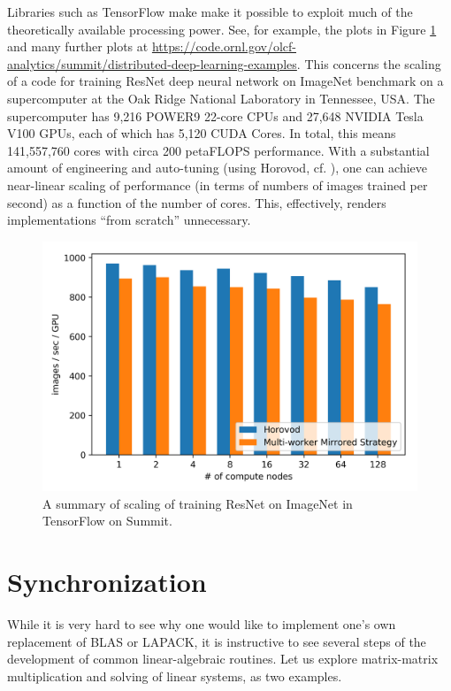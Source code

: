 Libraries such as TensorFlow make make it possible to
exploit much of the theoretically available processing 
power. See, for example, the plots 
in Figure \ref{fig:summit-tensorflow-performance2} and 
many further plots at 
\url{https://code.ornl.gov/olcf-analytics/summit/distributed-deep-learning-examples}.
This concerns the scaling of a code for training ResNet deep neural network on ImageNet 
benchmark on a supercomputer at the Oak Ridge National Laboratory 
in Tennessee, USA. 
The supercomputer has 
9,216 POWER9 22-core CPUs and 
27,648 NVIDIA Tesla V100 GPUs, each of which has 
5,120 CUDA Cores. 
In total, this means 141,557,760 cores with circa
200 petaFLOPS performance.
With a substantial amount of engineering and 
auto-tuning (using Horovod, cf. \cite{8945109}), one can achieve
near-linear scaling of performance (in terms of numbers of images trained per second) 
as a function of the number of cores. 
This, effectively, renders implementations 
``from scratch'' unnecessary. 

\begin{figure}[t!]
    \includegraphics[width=\textwidth]{./static/summit-tensorflow-performance2.png}
    \caption{A summary of scaling of training ResNet on ImageNet in TensorFlow on Summit.}
    \label{fig:summit-tensorflow-performance2}
    \end{figure}

\section{Synchronization}

While it is very hard to see why one would like to 
implement one's own replacement of BLAS or LAPACK, it is
instructive to see several steps of the development
of common linear-algebraic routines. 
Let us explore matrix-matrix multiplication and 
solving of linear systems, as two examples. 

